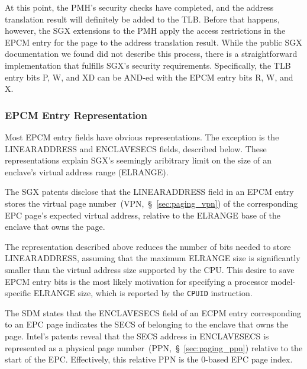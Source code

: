 At this point, the PMH's security checks have completed, and the address
translation result will definitely be added to the TLB. Before that happens,
however, the SGX extensions to the PMH apply the access restrictions in the
EPCM entry for the page to the address translation result. While the public SGX
documentation we found did not describe this process, there is a
straightforward implementation that fulfills SGX's security requirements.
Specifically, the TLB entry bits P, W, and XD can be AND-ed with the EPCM entry
bits R, W, and X.


\subsubsection{EPCM Entry Representation}
\label{sec:sgx_epcm_format}


Most EPCM entry fields have obvious representations. The exception is the
LINEARADDRESS and ENCLAVESECS fields, described below. These representations
explain SGX's seemingly aribitrary limit on the size of an enclave's virtual
address range (ELRANGE).

The SGX patents disclose that the LINEARADDRESS field in an EPCM entry stores
the virtual page number~(VPN,~\S~\ref{sec:paging_vpn}) of the corresponding EPC
page's expected virtual address, relative to the ELRANGE base of the enclave
that owns the page.

The representation described above reduces the number of bits needed to store
LINEARADDRESS, assuming that the maximum ELRANGE size is significantly smaller
than the virtual address size supported by the CPU. This desire to save EPCM
entry bits is the most likely motivation for specifying a processor
model-specific ELRANGE size, which is reported by the \texttt{CPUID}
instruction.

The SDM states that the ENCLAVESECS field of an ECPM entry corresponding to an
EPC page indicates the SECS of belonging to the enclave that owns the page.
Intel's patents reveal that the SECS address in ENCLAVESECS is represented as
a physical page number~(PPN,~\S~\ref{sec:paging_ppn}) relative to the start of
the EPC. Effectively, this relative PPN is the 0-based EPC page index.

